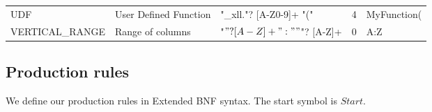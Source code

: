 \documentclass[conference]{IEEEtran}
\begin{document}
\begin{table*}
\begin{tabular}{@{}lllll@{}}
UDF                    & User Defined Function                                                                                                   & "\_xll."? {[}A-Z0-9{]}+ "("                                                                                                                                                                       & 4        & MyFunction(        \\
VERTICAL\_RANGE        & Range of columns                                                                                                        & "$"? [A-Z]+ ":" "$"? {[}A-Z{]}+                                                                                                                                                                   & 0        & A:Z                \\ \bottomrule
\end{tabular}
\end{table*}

\subsection{Production rules}

We define our production rules in Extended BNF syntax. The start symbol is $Start$.
\end{document}
